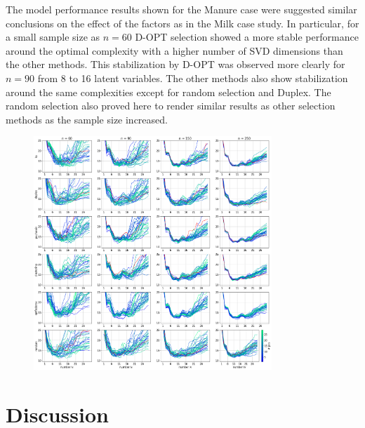\documentclass[journal=ancham,manuscript=article]{achemso}
\begin{document}
The model performance results shown for the Manure case were suggested similar conclusions on the effect of the factors as in the Milk case study. In particular, for a small sample size as $n=60$ D-OPT selection showed a more stable performance  around the optimal complexity with a higher number of SVD dimensions than the other methods. This stabilization by D-OPT was observed more clearly for $n=90$ from 8 to 16 latent variables. The other methods also show stabilization around the same complexities except for random selection and Duplex. The random selection also proved here to render similar results as other selection methods as the sample size increased.




\begin{figure}[b]
\includegraphics[width=0.8\textwidth]{manuscript/figures/d02_manure_model_performance.png}
\centering
\caption{}
\label{fig_d02_manure_model_performance}
\end{figure}


\section*{Discussion}\label{discussion}
\end{document}
